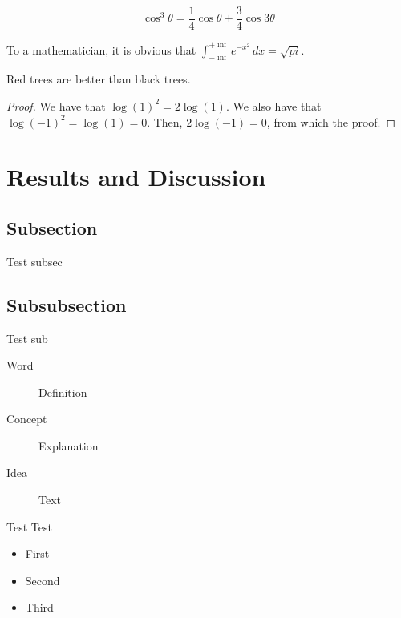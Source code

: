 \documentclass[10pt, 
a4paper, 
oneside, 
headinclude, footinclude, 
BCOR5mm]
{scrartcl}
\begin{document}
\begin{equation}
    \cos^3 \theta = \frac{1}{4}\cos\theta + \frac{3}{4}\cos 3\theta
    \label{eq:refname2}
\end{equation}

\begin{definition}[Gauss]
    To a mathematician, it is obvious that
    $\int_{-\inf}^{+\inf} e^{-x^2}\, dx=\sqrt{pi}$.
\end{definition}

\begin{theorem}
    Red trees are better than black trees.
\end{theorem}

\begin{proof}
    We have that $\log(1)^2 = 2\log(1)$.
    We also have that $\log(-1)^2 = \log(1) = 0$.
    Then, $2\log(-1) = 0$, from which the proof.
\end{proof}

\section{Results and Discussion}

\subsection{Subsection}
Test subsec

\subsection{Subsubsection}
Test sub

\begin{description}
    \item[Word] Definition
    \item[Concept] Explanation
    \item[Idea] Text
\end{description}

Test Test

\begin{itemize}[noitemsep]
    \item First
    \item Second
    \item Third
\end{itemize}
\end{document}
